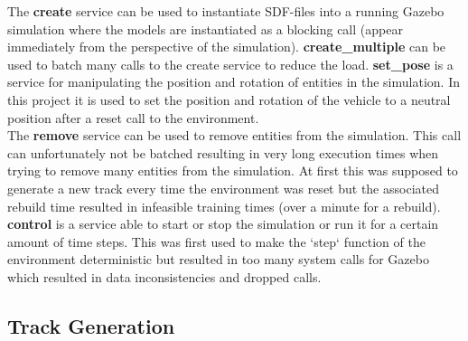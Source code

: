 The \textbf{create} service can be used to instantiate SDF-files into a running Gazebo simulation where the models are instantiated as a blocking call (appear immediately from the perspective of the simulation). \textbf{create\_multiple} can be used to batch many calls to the create service to reduce the load. \textbf{set\_pose} is a service for manipulating the position and rotation of entities in the simulation. In this project it is used to set the position and rotation of the vehicle to a neutral position after a reset call to the environment.\\
The \textbf{remove} service can be used to remove entities from the simulation. This call can unfortunately not be batched resulting in very long execution times when trying to remove many entities from the simulation. At first this was supposed to generate a new track every time the environment was reset but the associated rebuild time resulted in infeasible training times (over a minute for a rebuild).\\
\textbf{control} is a service able to start or stop the simulation or run it for a certain amount of time steps. This was first used to make the `step` function of the environment deterministic but resulted in too many system calls for Gazebo which resulted in data inconsistencies and dropped calls.

\subsection{Track Generation}

